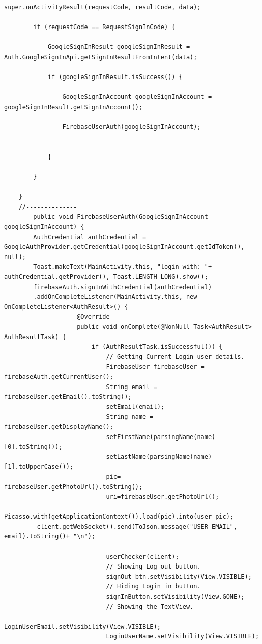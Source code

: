 \begin{itemize}
\begin{lstlisting}[frame=single]
        super.onActivityResult(requestCode, resultCode, data);

        if (requestCode == RequestSignInCode) {

            GoogleSignInResult googleSignInResult = Auth.GoogleSignInApi.getSignInResultFromIntent(data);

            if (googleSignInResult.isSuccess()) {

                GoogleSignInAccount googleSignInAccount = googleSignInResult.getSignInAccount();

                FirebaseUserAuth(googleSignInAccount);


            }

        }

    }
    //--------------
        public void FirebaseUserAuth(GoogleSignInAccount googleSignInAccount) {
        AuthCredential authCredential = GoogleAuthProvider.getCredential(googleSignInAccount.getIdToken(), null);
        Toast.makeText(MainActivity.this, "login with: "+ authCredential.getProvider(), Toast.LENGTH_LONG).show();
        firebaseAuth.signInWithCredential(authCredential)
        .addOnCompleteListener(MainActivity.this, new OnCompleteListener<AuthResult>() {
                    @Override
                    public void onComplete(@NonNull Task<AuthResult> AuthResultTask) {
                        if (AuthResultTask.isSuccessful()) {
                            // Getting Current Login user details.
                            FirebaseUser firebaseUser = firebaseAuth.getCurrentUser();
                            String email = firebaseUser.getEmail().toString();
                            setEmail(email);
                            String name = firebaseUser.getDisplayName();
                            setFirstName(parsingName(name)[0].toString());
                            setLastName(parsingName(name)[1].toUpperCase());
                            pic= firebaseUser.getPhotoUrl().toString();
                            uri=firebaseUser.getPhotoUrl();
                            Picasso.with(getApplicationContext()).load(pic).into(user_pic);
         client.getWebSocket().send(ToJson.message("USER_EMAIL", email).toString()+ "\n");

                            userChecker(client);
                            // Showing Log out button.
                            signOut_btn.setVisibility(View.VISIBLE);
                            // Hiding Login in button.
                            signInButton.setVisibility(View.GONE);
                            // Showing the TextView.
                            LoginUserEmail.setVisibility(View.VISIBLE);
                            LoginUserName.setVisibility(View.VISIBLE);


\end{lstlisting}
\end{itemize}
